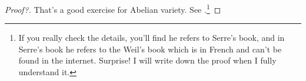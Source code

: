 \documentclass[reqno,11pt]{amsart}
\numberwithin{equation}{section}
\theoremstyle{plain}
\theoremstyle{plain}
\numberwithin{equation}{section}
\theoremstyle{remark}
\begin{document}
\begin{proof}[Proof?]
That's a good exercise for Abelian variety. See \cite[Lemma A.3]{yuan2021arithmetic}.\footnote{If you really check the details, you'll find he refers to Serre's book, and in Serre's book he refers to the Weil's book which is in French and can't be found in the internet. Surprise! I will write down the proof when I fully understand it.}
\end{proof}



\end{document}
